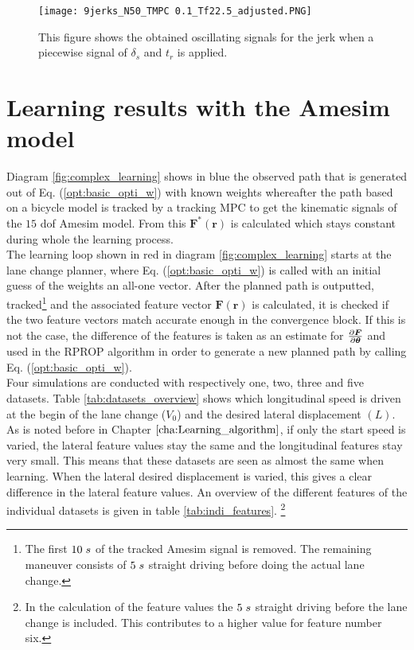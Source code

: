 \begin{figure}[h!]
	\centering
	\texttt{[image: 9jerks\_N50\_TMPC 0.1\_Tf22.5\_adjusted.PNG]}
	\caption{This figure shows the obtained oscillating signals for the jerk when a piecewise signal of $\delta_s$ and $t_r$ is applied.}	
	\label{fig:old_inputs}
\end{figure}

\section{Learning results with the Amesim model}
\label{s:complex_learning_results}
Diagram \ref{fig:complex_learning} shows in blue the observed path that is generated out of Eq. (\ref{opt:basic_opti_w}) with known weights whereafter the path based on a bicycle model is tracked by a tracking MPC to get the kinematic signals of the $15$ dof Amesim model. From this $\bm{F}^*(\bm{r})$ is calculated which stays constant during whole the learning process.\\

The learning loop shown in red in diagram \ref{fig:complex_learning} starts at the lane change planner, where Eq. (\ref{opt:basic_opti_w}) is called with an initial guess of the weights an all-one vector. After the planned path is outputted, tracked\footnote{The first $10 \hspace{1mm}s$ of the tracked Amesim signal is removed. The remaining maneuver consists of $5 \hspace{1mm}s$ straight driving before doing the actual lane change.} and the associated feature vector $\bm{F}(\bm{r})$ is calculated, it is checked if the two feature vectors match accurate enough in the convergence block. If this is not the case, the difference of the features is taken as an estimate for $\pdv{\bm{F}}{\bm{\theta}}$ and used in the RPROP algorithm in order to generate a new planned path by calling Eq. (\ref{opt:basic_opti_w}). \\

Four simulations are conducted with respectively one, two, three and five datasets. Table \ref{tab:datasets_overview} shows which longitudinal speed is driven at the begin of the lane change ($V_{0}$) and the desired lateral displacement $(L)$. As is noted before in Chapter $\ref{cha:Learning_algorithm}$, if only the start speed is varied, the lateral feature values stay the same and the longitudinal features stay very small. This means that these datasets are seen as almost the same when learning. When the lateral desired displacement is varied, this gives a clear difference in the lateral feature values. An overview of the different features of the individual datasets is given in table \ref{tab:indi_features}. \footnote{In the calculation of the feature values the $5 \hspace{1mm}s$ straight driving before the lane change is included. This contributes to a higher value for feature number six.} 



